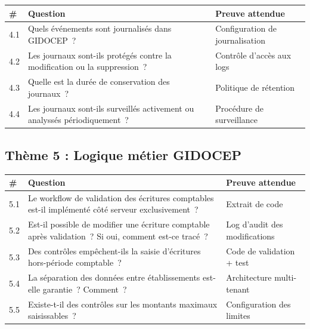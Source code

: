 \documentclass[12pt,a4paper,oneside]{report}
\begin{document}
\begin{longtable}{|p{0.5cm}|p{8cm}|p{5cm}|}
\hline
\rowcolor{theadcolor}
\color{white}\textbf{\#} &
\color{white}\textbf{Question} &
\color{white}\textbf{Preuve attendue} \\
\hline\endhead\hline\endfoot
\rowcolor{trow1}
4.1 & Quels \'ev\'enements sont journalis\'es dans GIDOCEP~? &
  Configuration de journalisation \\
\hline\rowcolor{trow2}
4.2 & Les journaux sont-ils prot\'eg\'es contre la modification ou la suppression~? &
  Contr\^ole d'acc\`es aux logs \\
\hline\rowcolor{trow1}
4.3 & Quelle est la dur\'ee de conservation des journaux~? &
  Politique de r\'etention \\
\hline\rowcolor{trow2}
4.4 & Les journaux sont-ils surveill\'es activement ou analyss\'es p\'eriodiquement~? &
  Proc\'edure de surveillance \\
\hline
\end{longtable}

\subsection*{Th\`eme 5 : Logique m\'etier GIDOCEP}

\begin{longtable}{|p{0.5cm}|p{8cm}|p{5cm}|}
\hline
\rowcolor{theadcolor}
\color{white}\textbf{\#} &
\color{white}\textbf{Question} &
\color{white}\textbf{Preuve attendue} \\
\hline\endhead\hline\endfoot
\rowcolor{trow1}
5.1 & Le workflow de validation des \'ecritures comptables est-il impl\'ement\'e c\^ot\'e serveur exclusivement~? &
  Extrait de code \\
\hline\rowcolor{trow2}
5.2 & Est-il possible de modifier une \'ecriture comptable apr\`es validation~? Si oui, comment est-ce trac\'e~? &
  Log d'audit des modifications \\
\hline\rowcolor{trow1}
5.3 & Des contr\^oles emp\^echent-ils la saisie d'\'ecritures hors-p\'eriode comptable~? &
  Code de validation + test \\
\hline\rowcolor{trow2}
5.4 & La s\'eparation des donn\'ees entre \'etablissements est-elle garantie~? Comment~? &
  Architecture multi-tenant \\
\hline\rowcolor{trow1}
5.5 & Existe-t-il des contr\^oles sur les montants maximaux saisissables~? &
  Configuration des limites \\
\hline
\end{longtable}
\end{document}

